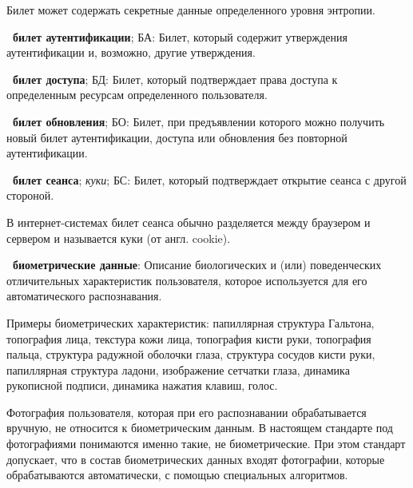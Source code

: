 \begin{note*}
Билет может содержать секретные данные определенного уровня энтропии.
\end{note*}

{\bf \thedefctr~билет аутентификации}; БА:
Билет, который содержит утверждения аутентификации и, возможно, другие
утверждения.

{\bf \thedefctr~билет доступа}; БД:
Билет, который подтверждает права доступа к определенным ресурсам определенного 
пользователя.

{\bf \thedefctr~билет обновления}; БО:
Билет, при предъявлении которого можно получить новый билет 
аутентификации, доступа или обновления без повторной аутентификации.

{\bf \thedefctr~билет сеанса}; {\it куки}; БС:
Билет, который подтверждает открытие сеанса с другой стороной. 

\begin{note*}
В интернет-системах билет сеанса обычно разделяется между браузером и 
сервером и называется куки (от англ. cookie).
\end{note*}

{\bf \thedefctr~биометрические данные}:
Описание биологических и (или) поведенческих отличительных характеристик 
пользователя, которое используется для его автоматического распознавания.

\begin{note}
Примеры биометрических характеристик: папиллярная структура Гальтона, топография
лица, текстура кожи лица, топография кисти руки, топография пальца, структура
радужной оболочки глаза, структура сосудов кисти руки, папиллярная структура
ладони, изображение сетчатки глаза, динамика рукописной подписи, динамика
нажатия клавиш, голос.
\end{note}

\begin{note}
Фотография пользователя, которая при его распознавании обрабатывается вручную,
не относится к биометрическим данным. В настоящем стандарте под фотографиями 
понимаются именно такие, не биометрические. При этом стандарт допускает, что в 
состав биометрических данных входят фотографии, которые обрабатываются 
автоматически, с помощью специальных алгоритмов.
\end{note}

%
% 
%
% 

